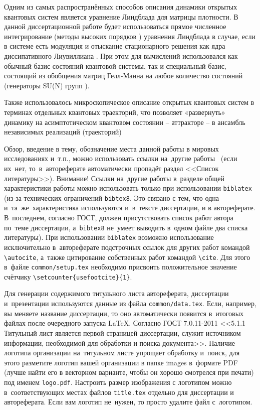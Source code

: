 {\methods} 
Одним из самых распространённых способов описания динамики открытых квантовых систем является уравнение Линдблада \autocite{Lindblad1976, Gorini1976, book2007} для матрицы плотности.
В данной диссертационной работе будет использоваться прямое численное интегрирование (методы высоких порядков \autocite{10.5555/129839}) уравнения Линдблада в случае, если в системе есть модуляция и отыскание стационарного решения как ядра диссипативного Лиувиллиана \autocite{Hartmann2017, Nation2015}. При этом для вычислений использовался как обычный базис состояний квантовой системы, так и специальный базис, состоящий из обобщения матриц Гелл-Манна \autocite{GellMann1962} на любое количество состояний \autocite{Lendi1987} (генераторы SU(N) групп \autocite{Georgi2018}).

Также использовалось микроскопическое описание открытых квантовых систем в терминах отдельных квантовых траекторий, что позволяет «развернуть» динамику на асимптотическом квантовом состоянии – аттракторе – в ансамбль независимых реализаций (траекторий) \autocite{Dalibard1992, Dum1992, Plenio1998, Volokitin2017}






Обзор, введение в тему, обозначение места данной работы в
мировых исследованиях и~т.\:п., можно использовать ссылки на~другие
работы~\autocite{Gosele1999161,Lermontov}
(если их~нет, то~в~автореферате
автоматически пропадёт раздел <<Список литературы>>). Внимание! Ссылки
на~другие работы в~разделе общей характеристики работы можно
использовать только при использовании \verb!biblatex! (из-за технических
ограничений \verb!bibtex8!. Это связано с тем, что одна
и~та~же~характеристика используются и~в~тексте диссертации, и в
автореферате. В~последнем, согласно ГОСТ, должен присутствовать список
работ автора по~теме диссертации, а~\verb!bibtex8! не~умеет выводить в~одном
файле два списка литературы).
При использовании \verb!biblatex! возможно использование исключительно
в~автореферате подстрочных ссылок
для других работ командой \verb!\autocite!, а~также цитирование
собственных работ командой \verb!\cite!. Для этого в~файле
\verb!common/setup.tex! необходимо присвоить положительное значение
счётчику \verb!\setcounter{usefootcite}{1}!.

Для генерации содержимого титульного листа автореферата, диссертации
и~презентации используются данные из файла \verb!common/data.tex!. Если,
например, вы меняете название диссертации, то оно автоматически
появится в~итоговых файлах после очередного запуска \LaTeX. Согласно
ГОСТ 7.0.11-2011 <<5.1.1 Титульный лист является первой страницей
диссертации, служит источником информации, необходимой для обработки и
поиска документа>>. Наличие логотипа организации на~титульном листе
упрощает обработку и~поиск, для этого разметите логотип вашей
организации в папке images в~формате PDF (лучше найти его в векторном
варианте, чтобы он хорошо смотрелся при печати) под именем
\verb!logo.pdf!. Настроить размер изображения с логотипом можно
в~соответствующих местах файлов \verb!title.tex!  отдельно для
диссертации и автореферата. Если вам логотип не~нужен, то просто
удалите файл с~логотипом.


